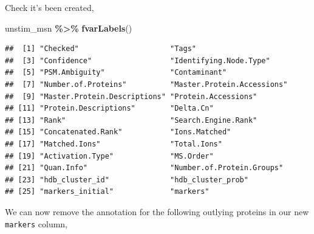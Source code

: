\documentclass[9pt,a4paper,]{extarticle}
\newenvironment{Shaded}{\begin{snugshade}}{\end{snugshade}}
\newcommand{\DocumentationTok}[1]{\textcolor[rgb]{0.56,0.35,0.01}{\textbf{\textit{#1}}}}
\newcommand{\FunctionTok}[1]{\textcolor[rgb]{0.13,0.29,0.53}{\textbf{#1}}}
\newcommand{\NormalTok}[1]{#1}
\newcommand{\OtherTok}[1]{\textcolor[rgb]{0.56,0.35,0.01}{#1}}
\newcommand{\SpecialCharTok}[1]{\textcolor[rgb]{0.81,0.36,0.00}{\textbf{#1}}}
\newcommand{\StringTok}[1]{\textcolor[rgb]{0.31,0.60,0.02}{#1}}
\begin{document}
Check it's been created,

\begin{Shaded}
\begin{Highlighting}[]
\NormalTok{unstim\_msn }\SpecialCharTok{\%\textgreater{}\%} \FunctionTok{fvarLabels}\NormalTok{()}
\end{Highlighting}
\end{Shaded}

\begin{verbatim}
##  [1] "Checked"                     "Tags"                       
##  [3] "Confidence"                  "Identifying.Node.Type"      
##  [5] "PSM.Ambiguity"               "Contaminant"                
##  [7] "Number.of.Proteins"          "Master.Protein.Accessions"  
##  [9] "Master.Protein.Descriptions" "Protein.Accessions"         
## [11] "Protein.Descriptions"        "Delta.Cn"                   
## [13] "Rank"                        "Search.Engine.Rank"         
## [15] "Concatenated.Rank"           "Ions.Matched"               
## [17] "Matched.Ions"                "Total.Ions"                 
## [19] "Activation.Type"             "MS.Order"                   
## [21] "Quan.Info"                   "Number.of.Protein.Groups"   
## [23] "hdb_cluster_id"              "hdb_cluster_prob"           
## [25] "markers_initial"             "markers"
\end{verbatim}

We can now remove the annotation for the following outlying proteins in our
new \texttt{markers} column,

\begin{Shaded}
\end{Shaded}
\end{document}
